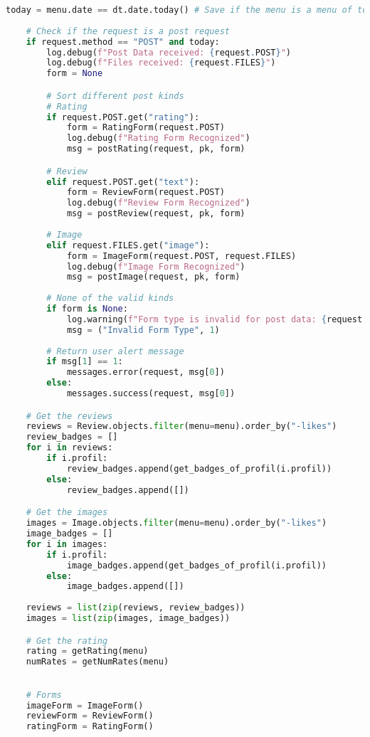 \begin{lstlisting}[language=Python]
    today = menu.date == dt.date.today() # Save if the menu is a menu of today
    
    # Check if the request is a post request
    if request.method == "POST" and today:
        log.debug(f"Post Data received: {request.POST}")
        log.debug(f"Files received: {request.FILES}")
        form = None

        # Sort different post kinds
        # Rating
        if request.POST.get("rating"):
            form = RatingForm(request.POST)
            log.debug(f"Rating Form Recognized")
            msg = postRating(request, pk, form)

        # Review
        elif request.POST.get("text"):
            form = ReviewForm(request.POST)
            log.debug(f"Review Form Recognized")
            msg = postReview(request, pk, form)
        
        # Image
        elif request.FILES.get("image"):
            form = ImageForm(request.POST, request.FILES)
            log.debug(f"Image Form Recognized")
            msg = postImage(request, pk, form)
        
        # None of the valid kinds
        if form is None:
            log.warning(f"Form type is invalid for post data: {request.POST}")
            msg = ("Invalid Form Type", 1)
        
        # Return user alert message
        if msg[1] == 1:
            messages.error(request, msg[0])
        else:
            messages.success(request, msg[0])

    # Get the reviews
    reviews = Review.objects.filter(menu=menu).order_by("-likes")
    review_badges = []
    for i in reviews:
        if i.profil:
            review_badges.append(get_badges_of_profil(i.profil))
        else:
            review_badges.append([])

    # Get the images
    images = Image.objects.filter(menu=menu).order_by("-likes")
    image_badges = []
    for i in images:
        if i.profil:
            image_badges.append(get_badges_of_profil(i.profil))
        else:
            image_badges.append([])
    
    reviews = list(zip(reviews, review_badges))
    images = list(zip(images, image_badges))

    # Get the rating
    rating = getRating(menu)
    numRates = getNumRates(menu)
    

    # Forms
    imageForm = ImageForm()
    reviewForm = ReviewForm()
    ratingForm = RatingForm()


\end{lstlisting}
